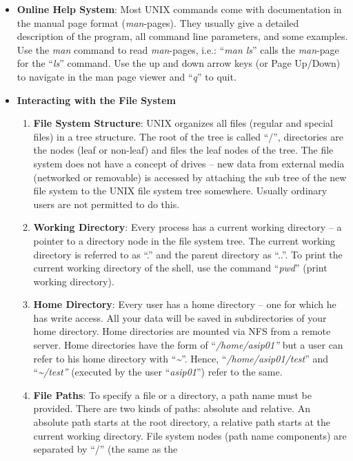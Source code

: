 \begin{itemize}
\item
  \textbf{Online Help System}: Most UNIX commands come with
  documentation in the manual page format (\emph{man}-pages). They
  usually give a detailed description of the program, all command line
  parameters, and some examples. Use the \emph{man} command to read
  \emph{man}-pages, i.e.: ``\emph{man ls}'' calls the \emph{man}-page
  for the ``\emph{ls}'' command. Use the up and down arrow keys (or Page
  Up/Down) to navigate in the man page viewer and ``\emph{q}'' to quit.
\item
  \textbf{Interacting with the File System}
  \begin{enumerate}
  \item
    \textbf{File System Structure}: UNIX organizes all files (regular
    and special files) in a tree structure. The root of the tree is
    called ``/'', directories are the nodes (leaf or non-leaf) and files
    the leaf nodes of the tree. The file system does not have a concept
    of drives -- new data from external media (networked or removable)
    is accessed by attaching the sub tree of the new file system to the
    UNIX file system tree somewhere. Usually ordinary users are not
    permitted to do this.
  \item
    \textbf{Working Directory}: Every process has a current working
    directory -- a pointer to a directory node in the file system tree.
    The current working directory is referred to as ``.'' and the parent
    directory as ``..''. To print the current working directory of the
    shell, use the command ``\emph{pwd}'' (print working directory).
  \item
    \textbf{Home Directory}: Every user has a home directory -- one for
    which he has write access. All your data will be saved in
    subdirectories of your home directory. Home directories are mounted
    via NFS from a remote server. Home directories have the form of
    ``\emph{/home/asip01''} but a user can refer to his home directory
    with ``\emph{\textasciitilde{}}''. Hence,
    ``\emph{/home/asip01/test}'' and ``\emph{\textasciitilde/test''}
    (executed by the user ``\emph{asip01}'') refer to the same.
  \item
    \textbf{File Paths}: To specify a file or a directory, a path name
    must be provided. There are two kinds of paths: absolute and
    relative. An absolute path starts at the root directory, a relative
    path starts at the current working directory. File system nodes
    (path name components) are separated by ``/'' (the same as the

\end{enumerate}
\end{itemize}
